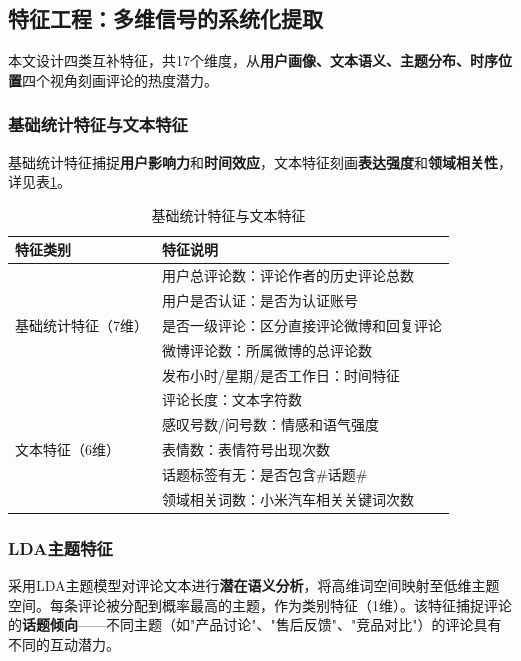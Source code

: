 \documentclass[10pt]{article}
\begin{document}
\subsection{特征工程：多维信号的系统化提取}

本文设计四类互补特征，共17个维度，从\textbf{用户画像、文本语义、主题分布、时序位置}四个视角刻画评论的热度潜力。

\subsubsection{基础统计特征与文本特征}

基础统计特征捕捉\textbf{用户影响力}和\textbf{时间效应}，文本特征刻画\textbf{表达强度}和\textbf{领域相关性}，详见表\ref{tab:features}。

\begin{table}[H]
\centering
\caption{基础统计特征与文本特征}
\label{tab:features}
\begin{tabular}{ll}
\toprule
\textbf{特征类别} & \textbf{特征说明} \\
\midrule
\multirow{5}{*}{基础统计特征（7维）}
    & 用户总评论数：评论作者的历史评论总数 \\
    & 用户是否认证：是否为认证账号 \\
    & 是否一级评论：区分直接评论微博和回复评论 \\
    & 微博评论数：所属微博的总评论数 \\
    & 发布小时/星期/是否工作日：时间特征 \\
\midrule
\multirow{5}{*}{文本特征（6维）}
    & 评论长度：文本字符数 \\
    & 感叹号数/问号数：情感和语气强度 \\
    & 表情数：表情符号出现次数 \\
    & 话题标签有无：是否包含\#话题\# \\
    & 领域相关词数：小米汽车相关关键词次数 \\
\bottomrule
\end{tabular}
\end{table}

\subsubsection{LDA主题特征}

采用LDA主题模型\cite{blei2003latent}对评论文本进行\textbf{潜在语义分析}，将高维词空间映射至低维主题空间。每条评论被分配到概率最高的主题，作为类别特征（1维）。该特征捕捉评论的\textbf{话题倾向}——不同主题（如"产品讨论"、"售后反馈"、"竞品对比"）的评论具有不同的互动潜力。
\end{document}
